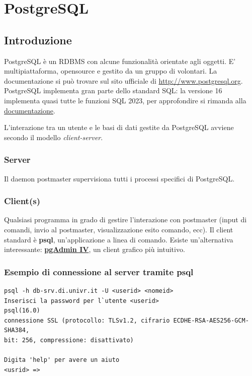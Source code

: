 \documentclass[11pt]{report}
\begin{document}
\customtitlepage
\newpage
\tableofcontents

\chapter{PostgreSQL}

\section{Introduzione}

PostgreSQL è un RDBMS con alcune funzionalità orientate agli oggetti. E' multipiattaforma, opensource e gestito da un gruppo di volontari. La documentazione si pu\`o trovare sul sito ufficiale di \url{http://www.postgresql.org}.
PostgreSQL implementa gran parte dello standard SQL: la versione 16 implementa quasi tutte le funzioni SQL 2023, per approfondire si rimanda alla \href{https://www.postgresql.org/docs/16/features.html}{documentazione}.

L'interazione tra un utente e le basi di dati gestite da PostgreSQL avviene secondo il modello \emph{client-server}.

\subsection{Server} 
Il daemon postmaster supervisiona tutti i processi specifici di PostgreSQL.
\subsection{Client(s)} 
Qualsiasi programma in grado di gestire l'interazione con postmaster (input di comandi, invio al postmaster, visualizzazione esito comando, ecc).
Il client standard \`e \textbf{psql}, un'applicazione a linea di comando. Esiste un'alternativa interessante: \href{http://www.pgadmin.org}{\textbf{pgAdmin IV}}, un client grafico pi\`u intuitivo.

\subsection{Esempio di connessione al server tramite psql}
\begin{lstlisting}
psql -h db-srv.di.univr.it -U <userid> <nomeid>
Inserisci la password per l`utente <userid>
psql(16.0)
connessione SSL (protocollo: TLSv1.2, cifrario ECDHE-RSA-AES256-GCM-SHA384, 
bit: 256, compressione: disattivato)

Digita 'help' per avere un aiuto
<usrid> =>
\end{lstlisting}
\end{document}
